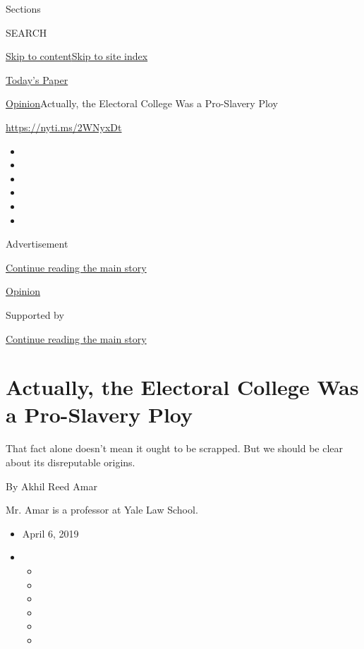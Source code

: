 Sections

SEARCH

\protect\hyperlink{site-content}{Skip to
content}\protect\hyperlink{site-index}{Skip to site index}

\href{https://myaccount.nytimes3xbfgragh.onion/auth/login?response_type=cookie\&client_id=vi}{}

\href{https://www.nytimes3xbfgragh.onion/section/todayspaper}{Today's
Paper}

\href{/section/opinion}{Opinion}\textbar{}Actually, the Electoral
College Was a Pro-Slavery Ploy

\url{https://nyti.ms/2WNyxDt}

\begin{itemize}
\item
\item
\item
\item
\item
\item
\end{itemize}

Advertisement

\protect\hyperlink{after-top}{Continue reading the main story}

\href{/section/opinion}{Opinion}

Supported by

\protect\hyperlink{after-sponsor}{Continue reading the main story}

\hypertarget{actually-the-electoral-college-was-a-pro-slavery-ploy}{%
\section{Actually, the Electoral College Was a Pro-Slavery
Ploy}\label{actually-the-electoral-college-was-a-pro-slavery-ploy}}

That fact alone doesn't mean it ought to be scrapped. But we should be
clear about its disreputable origins.

By Akhil Reed Amar

Mr. Amar is a professor at Yale Law School.

\begin{itemize}
\item
  April 6, 2019
\item
  \begin{itemize}
  \item
  \item
  \item
  \item
  \item
  \item
  \end{itemize}
\end{itemize}

